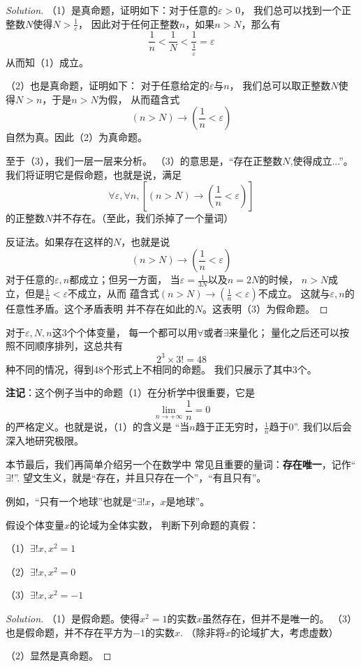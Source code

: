 \begin{proof}[Solution]
（1）是真命题，证明如下：对于任意的$\varepsilon>0$，
我们总可以找到一个正整数$N$使得$N>\frac{1}{\varepsilon}$，
因此对于任何正整数$n$，如果$n>N$，那么有
$$\frac{1}{n}<\frac{1}{N}<
\frac{1}{\frac{1}{\varepsilon}}=\varepsilon$$
从而知（1）成立。\vs

（2）也是真命题，证明如下：
对于任意给定的$\varepsilon$与$n$，
我们总可以取正整数$N$使得$N>n$，于是$n>N$为假，
从而蕴含式
$$(n>N)\rightarrow(\frac{1}{n}<\varepsilon)$$
自然为真。因此（2）为真命题。\vs

至于（3），我们一层一层来分析。
（3）的意思是，“存在正整数$N$,使得成立...”。
我们将证明它是假命题，也就是说，满足
$$\forall\varepsilon,\forall n,[(n>N)
\rightarrow(\frac{1}{n}<\varepsilon)]$$
的正整数$N$并不存在。（至此，我们杀掉了一个量词）

反证法。如果存在这样的$N$，也就是说
$$(n>N)\rightarrow(\frac{1}{n}<\varepsilon)$$
对于任意的$\varepsilon,n$都成立；但另一方面，
当$\varepsilon=\frac{1}{3N}$以及$n=2N$的时候，
$n>N$成立，但是$\frac{1}{n}<\varepsilon$不成立，从而
蕴含式$(n>N)\rightarrow(\frac{1}{n}<\varepsilon)$不成立。
这就与$\varepsilon,n$的任意性矛盾。这个矛盾表明
并不存在如此的$N$。这表明（3）为假命题。
\end{proof}\vs

对于$\varepsilon,N,n$这3个个体变量，
每一个都可以用$\forall$或者$\exists$来量化；
量化之后还可以按照不同顺序排列，这总共有
$$2^3\times3!=48$$
种不同的情况，得到48个形式上不相同的命题。
我们只展示了其中3个。\vs

\textbf{注记}：这个例子当中的命题（1）在分析学中很重要，它是
$$\lim_{n\rightarrow+\infty}\frac{1}{n}=0$$
的严格定义。也就是说，（1）的含义是
“当$n$趋于正无穷时，$\frac{1}{n}$趋于0”.
我们以后会深入地研究极限。\vs

本节最后，我们再简单介绍另一个在数学中
常见且重要的量词：\textbf{存在唯一}，记作“$\exists!$”.
望文生义，就是“存在，并且只存在一个”，“有且只有”。

例如，“只有一个地球”也就是“$\exists!x$，$x$是地球”。

\begin{example}假设个体变量$x$的论域为全体实数，
判断下列命题的真假：

（1）$\exists!x,x^2=1$

（2）$\exists!x,x^2=0$

（3）$\exists!x,x^2=-1$
\end{example}

\begin{proof}[Solution]
（1）是假命题。使得$x^2=1$的实数$x$虽然存在，但并不是唯一的。
（3）也是假命题，并不存在平方为$-1$的实数$x$.
（除非将$x$的论域扩大，考虑虚数）

（2）显然是真命题。
\end{proof}

